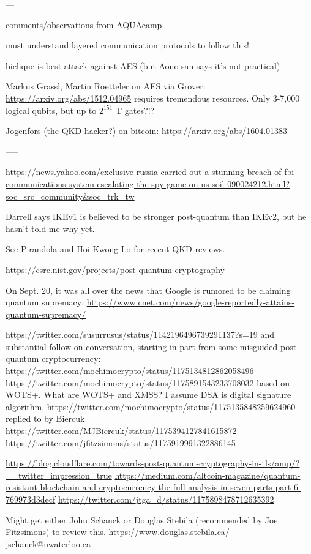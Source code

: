 \documentclass[%
 aip,
 jmp,%
 amsmath,amssymb,
 reprint,%
]{revtex4-1}
\begin{document}
---

comments/observations from AQUAcamp

must understand layered communication protocols to follow this!


biclique is best attack against AES
(but Aono-san says it's not practical)

Markus Grassl, Martin Roetteler on AES via Grover:
\url{https://arxiv.org/abs/1512.04965}
requires tremendous resources.
Only 3-7,000 logical qubits, but up to $2^{151}$ T gates?!?

Jogenfors (the QKD hacker?) on bitcoin:
\url{https://arxiv.org/abs/1604.01383}

-----

\url{https://news.yahoo.com/exclusive-russia-carried-out-a-stunning-breach-of-fbi-communications-system-escalating-the-spy-game-on-us-soil-090024212.html?soc_src=community&soc_trk=tw}

Darrell says IKEv1 is believed to be stronger post-quantum than IKEv2,
but he hasn't told me why yet.

See Pirandola and Hoi-Kwong Lo for recent QKD reviews.

\url{https://csrc.nist.gov/projects/post-quantum-cryptography}

On Sept. 20, it was all over the news that Google is rumored to be
claiming quantum supremacy:
\url{https://www.cnet.com/news/google-reportedly-attains-quantum-supremacy/}

\url{https://twitter.com/susurrusus/status/1142196496739291137?s=19}
and substantial follow-on conversation, starting in part from some
misguided post-quantum cryptocurrency:
\url{https://twitter.com/mochimocrypto/status/1175134812862058496}
\url{https://twitter.com/mochimocrypto/status/1175891543233708032}
based on WOTS+.
What are WOTS+ and XMSS?  I assume DSA is digital signature algorithm.
\url{https://twitter.com/mochimocrypto/status/1175135848259624960}
replied to by Biercuk
\url{https://twitter.com/MJBiercuk/status/1175394127841615872}
\url{https://twitter.com/jfitzsimons/status/1175919991322886145}

\url{https://blog.cloudflare.com/towards-post-quantum-cryptography-in-tls/amp/?__twitter_impression=true}
\url{https://medium.com/altcoin-magazine/quantum-resistant-blockchain-and-cryptocurrency-the-full-analysis-in-seven-parts-part-6-769973d3decf}
\url{https://twitter.com/jtga_d/status/1175898478712635392}

Might get either John Schanck or Douglas Stebila (recommended by Joe
Fitzsimons) to review this.
\url{https://www.douglas.stebila.ca/}
jschanck@uwaterloo.ca
\end{document}
